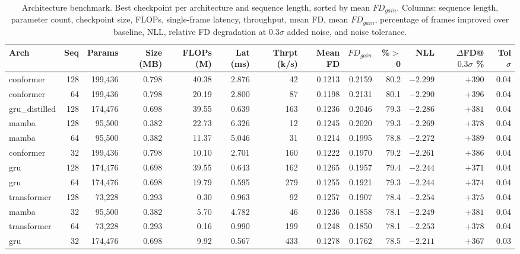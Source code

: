 \documentclass[
reprint,
aps,
prd,
superscriptaddress,
nofootinbib
]{revtex4-2}
\begin{document}
\begin{table}[ht]
\centering
\caption{Architecture benchmark. Best checkpoint per architecture and sequence length, sorted by mean $FD_{gain}$. Columns: sequence length, parameter count, checkpoint size, FLOPs, single-frame latency, throughput, mean FD, mean $FD_{gain}$, percentage of frames improved over baseline, NLL, relative FD degradation at $0.3\sigma$ added noise, and noise tolerance.}
\label{tab:benchmark}
\footnotesize
\begin{tabular}{l r r r r r r r r r r r r}
\toprule
Arch & Seq & Params & Size (MB) & FLOPs (M) & Lat (ms) & Thrpt (k/s) & Mean FD & $FD_{gain}$ & \%$>$0 & NLL & $\Delta$FD@$0.3\sigma$ \% & Tol $\sigma$ \\
\midrule
conformer   & 128 & 199{,}436 & 0.798 & 40.38 & 2.876 & 42   & 0.1213 & 0.2159 & 80.2 & $-2.299$ & $+390$ & 0.04 \\
conformer   & 64  & 199{,}436 & 0.798 & 20.19 & 2.800 & 87   & 0.1198 & 0.2131 & 80.1 & $-2.290$ & $+396$ & 0.04 \\
gru\_distilled & 128 & 174{,}476 & 0.698 & 39.55 & 0.639 & 163  & 0.1236 & 0.2046 & 79.3 & $-2.286$ & $+381$ & 0.04 \\
mamba       & 128 & 95{,}500 & 0.382 & 22.73 & 6.326 & 12   & 0.1245 & 0.2020 & 79.3 & $-2.269$ & $+378$ & 0.04 \\
mamba       & 64  & 95{,}500 & 0.382 & 11.37 & 5.046 & 31   & 0.1214 & 0.1995 & 78.8 & $-2.272$ & $+389$ & 0.04 \\
conformer   & 32  & 199{,}436 & 0.798 & 10.10 & 2.701 & 160  & 0.1222 & 0.1970 & 79.2 & $-2.261$ & $+386$ & 0.04 \\
gru         & 128 & 174{,}476 & 0.698 & 39.55 & 0.643 & 162  & 0.1265 & 0.1957 & 79.4 & $-2.244$ & $+371$ & 0.04 \\
gru         & 64  & 174{,}476 & 0.698 & 19.79 & 0.595 & 279  & 0.1255 & 0.1921 & 79.3 & $-2.244$ & $+374$ & 0.04 \\
transformer & 128 & 73{,}228 & 0.293 & 0.30 & 0.963 & 92   & 0.1257 & 0.1907 & 78.4 & $-2.254$ & $+375$ & 0.04 \\
mamba       & 32  & 95{,}500 & 0.382 & 5.70 & 4.782 & 46   & 0.1236 & 0.1858 & 78.1 & $-2.249$ & $+381$ & 0.04 \\
transformer & 64  & 73{,}228 & 0.293 & 0.16 & 0.990 & 199  & 0.1248 & 0.1850 & 78.1 & $-2.253$ & $+378$ & 0.04 \\
gru         & 32  & 174{,}476 & 0.698 & 9.92 & 0.567 & 433  & 0.1278 & 0.1762 & 78.5 & $-2.211$ & $+367$ & 0.03 \\

\end{tabular}
\end{table}
\end{document}
